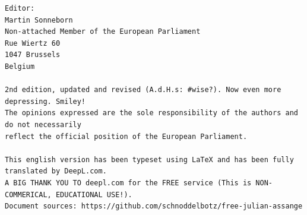 \vspace*{\fill}
\begin{flushright}
\begin{verbatim}
Editor:
Martin Sonneborn
Non-attached Member of the European Parliament
Rue Wiertz 60
1047 Brussels
Belgium

2nd edition, updated and revised (A.d.H.s: #wise?). Now even more depressing. Smiley!
The opinions expressed are the sole responsibility of the authors and do not necessarily 
reflect the official position of the European Parliament.

This english version has been typeset using LaTeX and has been fully translated by DeepL.com.
A BIG THANK YOU TO deepl.com for the FREE service (This is NON-COMMERICAL, EDUCATIONAL USE!).
Document sources: https://github.com/schnoddelbotz/free-julian-assange
\end{verbatim}
\end{flushright}

\newpage
\color{black}
\thispagestyle{empty} %
\tableofcontents
\thispagestyle{empty} %

